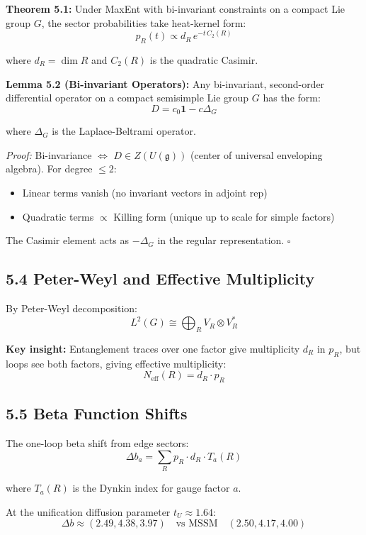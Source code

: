 \textbf{Theorem 5.1:} Under MaxEnt with bi-invariant constraints on a compact Lie group \(G\), the sector probabilities take heat-kernel form: \[p_R(t) \propto d_R \, e^{-t \, C_2(R)}\]

where \(d_R = \dim R\) and \(C_2(R)\) is the quadratic Casimir.

\textbf{Lemma 5.2 (Bi-invariant Operators):} Any bi-invariant, second-order differential operator on a compact semisimple Lie group \(G\) has the form: \[D = c_0 \mathbf{1} - c \Delta_G\]

where \(\Delta_G\) is the Laplace-Beltrami operator.

\emph{Proof:} Bi-invariance \(\Leftrightarrow\) \(D \in Z(U(\mathfrak{g}))\) (center of universal enveloping algebra). For degree \(\leq 2\):

\begin{itemize}
\tightlist
\item
  Linear terms vanish (no invariant vectors in adjoint rep)
\item
  Quadratic terms \(\propto\) Killing form (unique up to scale for simple factors)
\end{itemize}

The Casimir element acts as \(-\Delta_G\) in the regular representation. \(\square\)

\subsection{5.4 Peter-Weyl and Effective Multiplicity}\label{54-peter-weyl-and-effective-multiplicity}

By Peter-Weyl decomposition: \[L^2(G) \cong \bigoplus_R V_R \otimes V_R^*\]

\textbf{Key insight:} Entanglement traces over one factor give multiplicity \(d_R\) in \(p_R\), but loops see both factors, giving effective multiplicity: \[N_{\text{eff}}(R) = d_R \cdot p_R\]

\subsection{5.5 Beta Function Shifts}\label{55-beta-function-shifts}

The one-loop beta shift from edge sectors: \[\Delta b_a = \sum_R p_R \cdot d_R \cdot T_a(R)\]

where \(T_a(R)\) is the Dynkin index for gauge factor \(a\).

At the unification diffusion parameter \(t_U \approx 1.64\): \[\Delta b \approx (2.49, 4.38, 3.97) \quad \text{vs MSSM} \quad (2.50, 4.17, 4.00)\]

